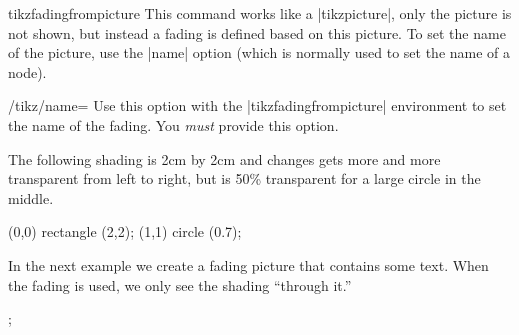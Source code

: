 \begin{environment}{{tikzfadingfrompicture}}
  This command works like a |{tikzpicture}|, only the picture is not
  shown, but instead a fading is defined based on this picture. To set
  the name of the picture, use the |name| option (which is normally
  used to set the name of a node).
  \begin{key}{/tikz/name=}
    Use this option with the |{tikzfadingfrompicture}| environment to
    set the name of the fading. You \emph{must} provide this option.
  \end{key}

  The following shading is 2cm by 2cm and changes gets more and more
  transparent from left to right, but is 50\% transparent for a large
  circle in the middle.
{\tikzexternaldisable
\begin{codeexample}[]
\begin{tikzfadingfrompicture}[name=fade right]
  \shade[left color=transparent!0,
         right color=transparent!100] (0,0) rectangle (2,2);
  \fill[transparent!50] (1,1) circle (0.7);
\end{tikzfadingfrompicture}

\end{codeexample}
  In the next example we create a fading picture that contains some
  text. When the fading is used, we only see the shading ``through
  it.''
\begin{codeexample}[]
\begin{tikzfadingfrompicture}[name=tikz]
  ;
\end{tikzfadingfrompicture}

\end{codeexample}
}%
\end{environment}

